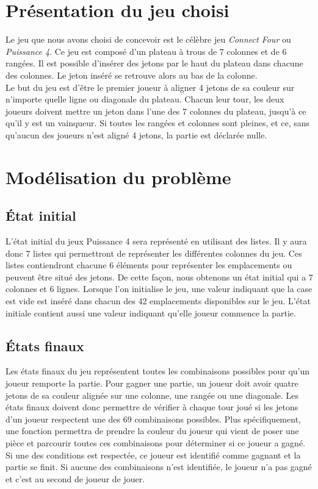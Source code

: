 \documentclass[12pt]{article}
\begin{document}
\section*{Présentation du jeu choisi}
Le jeu que nous avons choisi de concevoir est le célèbre jeu \textit{Connect Four} ou \textit{Puissance 4}. Ce jeu est composé d'un plateau à trous de 7 colonnes et de 6 rangées. Il est possible d'insérer des jetons par le haut du plateau dans chacune des colonnes. Le jeton inséré se retrouve alors au bas de la colonne. \\

Le but du jeu est d'être le premier joueur à aligner 4 jetons de sa couleur sur n'importe quelle ligne ou diagonale du plateau. Chacun leur tour, les deux joueurs doivent mettre un jeton dans l'une des 7 colonnes du plateau, jusqu'à ce qu'il y est un vainqueur. Si toutes les rangées et colonnes sont pleines, et ce, sans qu'aucun des joueurs n'est aligné 4 jetons, la partie est déclarée nulle.

\section*{Modélisation du problème}

\subsection*{État initial}
L'état initial du jeux Puissance 4 sera représenté en utilisant des listes. Il y aura donc 7 listes qui permettront de représenter les différentes colonnes du jeu. Ces listes contiendront chacune 6 éléments pour représenter les emplacements ou peuvent être situé des jetons. De cette façon, nous obtenons un état initial qui a 7 colonnes et 6 lignes. Lorsque l’on initialise le jeu, une valeur indiquant que la case est vide est inséré dans chacun des 42 emplacements disponibles sur le jeu. L’état initiale contient aussi une valeur indiquant qu’elle joueur commence la partie.

\subsection*{États finaux}
Les états finaux du jeu représentent toutes les combinaisons possibles pour qu’un joueur remporte la partie. Pour gagner une partie, un joueur doit avoir quatre jetons de sa couleur alignée sur une colonne, une rangée ou une diagonale. Les états finaux doivent donc permettre de vérifier à chaque tour joué si les jetons d’un joueur respectent une des 69 combinaisons possibles. Plus spécifiquement, une fonction permettra de prendre la couleur du joueur qui vient de poser une pièce et parcourir toutes ces combinaisons pour déterminer si ce joueur a gagné. Si une des conditions est respectée, ce joueur est identifié comme gagnant et la partie se finit. Si aucune des combinaisons n’est identifiée, le joueur n’a pas gagné et c’est au second de joueur de jouer. 
\end{document}

